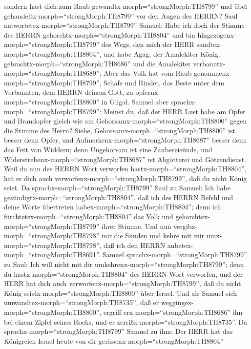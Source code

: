 sondern hast dich zum Raub gewandtx-morph=``strongMorph:TH8799'' und
übel gehandeltx-morph=``strongMorph:TH8799'' vor den Augen des HERRN?
 Saul antwortetex-morph=``strongMorph:TH8799'' Samuel: Habe
ich doch der Stimme des HERRN gehorchtx-morph=``strongMorph:TH8804'' und
bin hingezogenx-morph=``strongMorph:TH8799'' des Wegs, den mich der HERR
sandtex-morph=``strongMorph:TH8804'', und habe Agag, der Amalekiter
König, gebrachtx-morph=``strongMorph:TH8686'' und die Amalekiter
verbanntx-morph=``strongMorph:TH8689'';  Aber das Volk hat
vom Raub genommenx-morph=``strongMorph:TH8799'', Schafe und Rinder, das
Beste unter dem Verbannten, dem HERRN deinem Gott, zu
opfernx-morph=``strongMorph:TH8800'' in Gilgal.  Samuel
aber sprachx-morph=``strongMorph:TH8799'': Meinst du, daß der HERR Lust
habe am Opfer und Brandopfer gleich wie am
Gehorsamx-morph=``strongMorph:TH8800'' gegen die Stimme des Herrn?
Siehe, Gehorsamx-morph=``strongMorph:TH8800'' ist besser denn Opfer, und
Aufmerkenx-morph=``strongMorph:TH8687'' besser denn das Fett von
Widdern;  denn Ungehorsam ist eine Zaubereisünde, und
Widerstrebenx-morph=``strongMorph:TH8687'' ist Abgötterei und
Götzendienst. Weil du nun des HERRN Wort verworfen
hastx-morph=``strongMorph:TH8804'', hat er dich auch
verworfenx-morph=``strongMorph:TH8799'', daß du nicht König seist.
 Da sprachx-morph=``strongMorph:TH8799'' Saul zu Samuel:
Ich habe gesündigtx-morph=``strongMorph:TH8804'', daß ich des HERRN
Befehl und deine Worte übertreten habex-morph=``strongMorph:TH8804'';
denn ich fürchtetex-morph=``strongMorph:TH8804'' das Volk und
gehorchtex-morph=``strongMorph:TH8799'' ihrer Stimme.  Und
nun vergibx-morph=``strongMorph:TH8798'' mir die Sünden und kehre mit
mir umx-morph=``strongMorph:TH8798'', daß ich den HERRN
anbetex-morph=``strongMorph:TH8691''.  Samuel
sprachx-morph=``strongMorph:TH8799'' zu Saul: Ich will nicht mit dir
umkehrenx-morph=``strongMorph:TH8799''; denn du
hastx-morph=``strongMorph:TH8804'' des HERRN Wort verworfen, und der
HERR hat dich auch verworfenx-morph=``strongMorph:TH8799'', daß du nicht
König seistx-morph=``strongMorph:TH8800'' über Israel.  Und
als Samuel sich umwandtex-morph=``strongMorph:TH8735'', daß er
weggingex-morph=``strongMorph:TH8800'', ergriff
erx-morph=``strongMorph:TH8686'' ihn bei einem Zipfel seines Rocks, und
er zerrißx-morph=``strongMorph:TH8735''.  Da
sprachx-morph=``strongMorph:TH8799'' Samuel zu ihm: Der HERR hat das
Königreich Israel heute von dir gerissenx-morph=``strongMorph:TH8804''
